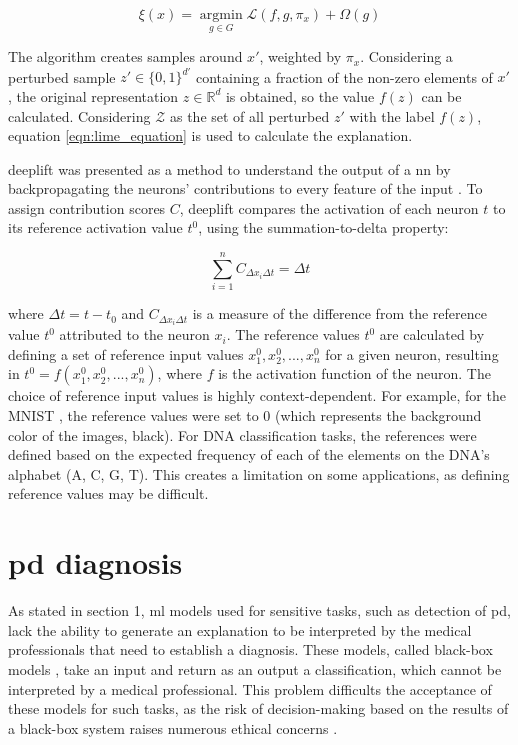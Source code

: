 \begin{equation}
\label{eqn:lime_equation}
\xi(x) = \operatorname*{argmin}_{g\in G} \mathcal{L}(f,g,\pi_x) + \Omega(g)
\end{equation}

The algorithm creates samples around $x'$, weighted by $\pi_x$. Considering a perturbed sample $ z' \in \{0,1\}^{d'}$ containing a fraction of the non-zero elements of $x'$, the original representation $z \in \mathbb{R}^d$ is obtained, so the value $f(z)$ can be calculated. Considering $\mathcal{Z}$ as the set of all perturbed $z'$ with the label $f(z)$, equation \ref{eqn:lime_equation} is used to calculate the explanation.  

\gls{deeplift} was presented as a method to understand the output of a \gls{nn} by backpropagating the neurons' contributions to every feature of the input \cite{DeepLIFT}. To assign contribution scores $C$, \gls{deeplift} compares the activation of each neuron $t$ to its reference activation value $t^0$, using the summation-to-delta property:

\begin{equation}
\sum_{i=1}^n C_{\Delta x_i \Delta t} = \Delta t
\end{equation}

where $ \Delta t = t - t_0 $ and $ C_{\Delta x_i \Delta t} $ is a measure of the difference from the reference value $t^0$ attributed to the neuron $ x_i $. The reference values $ t^0 $ are calculated by defining a set of reference input values $x_1^0, x_2^0,...,x_n^0$ for a given neuron, resulting in $ t^0 = f(x_1^0, x_2^0,...,x_n^0) $, where $f$ is the activation function of the neuron. The choice of reference input values is highly context-dependent. For example, for the MNIST \cite{MNIST}, the reference values were set to 0 (which represents the background color of the images, black). For DNA classification tasks, the references were defined based on the expected frequency of each of the elements on the DNA's alphabet (A, C, G, T). This creates a limitation on some applications, as defining reference values may be difficult.

\section{\acrlong{pd} diagnosis}

As stated in section 1, \gls{ml} models used for sensitive tasks, such as detection of \gls{pd}, lack the ability to generate an explanation to be interpreted by the medical professionals that need to establish a diagnosis. These models, called black-box models \cite{explainable_ai_systems}, take an input and return as an output a classification, which cannot be interpreted by a medical professional. This problem difficults the acceptance of these models for such tasks, as the risk of decision-making based on the results of a black-box system raises numerous ethical concerns \cite{ethical_black_box_decision}.

